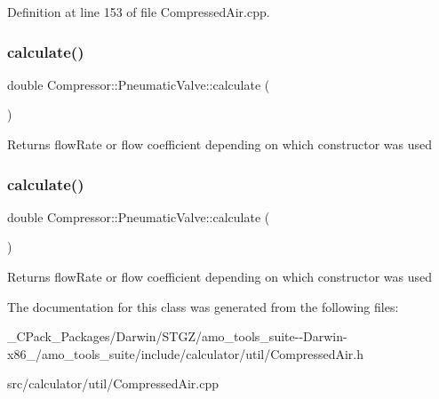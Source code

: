 Definition at line 153 of file Compressed\+Air.\+cpp.

\mbox{\label{class_compressor_1_1_pneumatic_valve_aa9e11ab6f1e75730519a69fccfaa53c2}} 
\subsubsection{\texorpdfstring{calculate()}{calculate()}\hspace{0.1cm}{\footnotesize\ttfamily [2/3]}}
{\footnotesize\ttfamily double Compressor\+::\+Pneumatic\+Valve\+::calculate (\begin{DoxyParamCaption}{ }\end{DoxyParamCaption})}

\begin{DoxyReturn}{Returns}
flow\+Rate or flow coefficient depending on which constructor was used 
\end{DoxyReturn}
\mbox{\label{class_compressor_1_1_pneumatic_valve_aa9e11ab6f1e75730519a69fccfaa53c2}} 
\subsubsection{\texorpdfstring{calculate()}{calculate()}\hspace{0.1cm}{\footnotesize\ttfamily [3/3]}}
{\footnotesize\ttfamily double Compressor\+::\+Pneumatic\+Valve\+::calculate (\begin{DoxyParamCaption}{ }\end{DoxyParamCaption})}

\begin{DoxyReturn}{Returns}
flow\+Rate or flow coefficient depending on which constructor was used 
\end{DoxyReturn}


The documentation for this class was generated from the following files\+:\begin{DoxyCompactItemize}
\item 
\+\_\+\+C\+Pack\+\_\+\+Packages/\+Darwin/\+S\+T\+G\+Z/amo\+\_\+tools\+\_\+suite-\/-\/\+Darwin-\/x86\+\_/amo\+\_\+tools\+\_\+suite/include/calculator/util/Compressed\+Air.\+h\item 
src/calculator/util/Compressed\+Air.\+cpp\end{DoxyCompactItemize}
